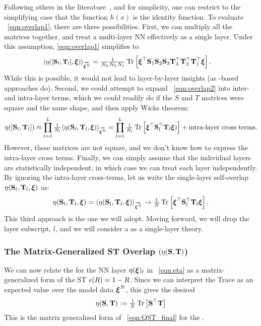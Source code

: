 Following others in the literature~\cite{SMG2013_TR}, and for simplicity, one can restrict to the simplifying case that the function $h(x)$ is the identity function.
To evaluate \EQN~\ref{eqn:overlap1}, there are three possibilities.
First, we can multiply all the matrices together, and treat a multi-layer NN effectively as a single layer.
Under this assumption, \EQN \ref{eqn:overlap1} simplifies to
%
\begin{align}
\label{eqn:overlap2}
  \ETAMLPAVG &= \tfrac{1}{N_3 \, N_2 \, N_1} 
  \Trace{ \boldsymbol{\xi}^\top 
    \mathbf{S}_1 \mathbf{S}_2 \mathbf{S}_3 
    \mathbf{T}_3^{\top} \mathbf{T}_2^{\top} \mathbf{T}_1^{\top} 
    \boldsymbol{\xi} }.
\end{align}
While this is possible, it would not lead to layer-by-layer insights (as \HTSR-based approaches do).
%
Second, we could attempt to expand \EQN~\ref{eqn:overlap2} into inter- and intra-layer terms, 
which we could readily do if the $S$ and $T$ matrices were square and the same shape, and then apply Wicks theorem:
\begin{align}
\ETAMLP\approx\prod_{l=1}^{L}\tfrac{1}{N_l}\ETAMATAVG=\prod_{l=1}^{L}\tfrac{1}{N_l}\Trace{ \XI^{\top} \mathbf{S}^{\top}_{l} \mathbf{T}_{l} \XI) } +\text{intra-layer cross terms}.
\end{align}
However, these matrices are not square, and we don't know how to express the intra-layer cross terms.
%
Finally, we can simply assume that the individual layers are statistically independent, in which case we can treat each layer independently.
By ignoring the intra-layer cross-terms, let us write the single-layer self-overlap $\eta({\mathbf{S}}_l,{\mathbf{T}}_l,\boldsymbol{\xi})$ as:
\begin{align}
  \label{eqn:eta}
  \ETAMAT =
        \ETAMATAVG\rightarrow \tfrac{1}{N} \Trace{ \XI^{\top} \mathbf{S}^{\top}_{l} \mathbf{T}_{l} \XI }  .
\end{align}
This third approach is the one we will adopt.
Moving forward, we will drop the layer subscript, $l$, and we will consider a \SETOL as a single-layer theory.


\subsubsection{The Matrix-Generalized ST Overlap $(\eta({\mathbf{S}},{\mathbf{T}})$)}

We can now relate the \SelfOverlap for the NN layer $\eta(\boldsymbol{\xi})_{l}$ in \EQN~\ref{eqn:eta}
as a matrix-generalized form of the ST \EffectivePotential $\epsilon(R)=1-R$.
Since we can interpret the Trace as an expected value over the model data $\boldsymbol{\xi}^{N}$, this gives the desired
\begin{align}
  \label{eqn:eta_mat_avg_def}
  \eta({\mathbf{S}},{\mathbf{T}})
  :=\tfrac{1}{N} \mbox{}\operatorname{Tr}\left[\mathbf{S}^{\top}\mathbf{T}\right] 
\end{align}
This is the matrix generalized form of \EQN~\ref{eqn:QST_final} for the \LayerQuality.

